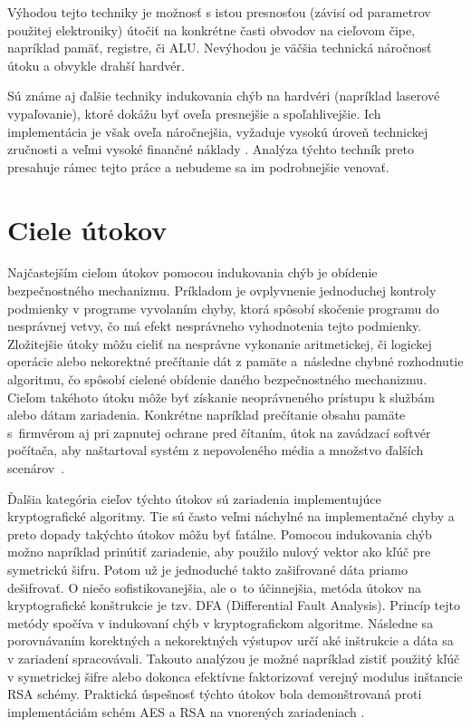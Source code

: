 Výhodou tejto techniky je možnosť s istou presnosťou (závisí od parametrov použitej elektroniky) útočiť na konkrétne časti obvodov na cieľovom čipe, napríklad pamäť, registre, či ALU. Nevýhodou je väčšia technická náročnosť útoku a obvykle drahší hardvér.

Sú známe aj ďalšie techniky indukovania chýb na hardvéri (napríklad laserové vypaľovanie), ktoré dokážu byť oveľa presnejšie a spoľahlivejšie. Ich implementácia je však oveľa náročnejšia, vyžaduje vysokú úroveň technickej zručnosti a veľmi vysoké finančné náklady \cite{laserFI}. Analýza týchto techník preto presahuje rámec tejto práce a nebudeme sa im podrobnejšie venovať.

\section{Ciele útokov} \label{kap1:sek:cieleUtokov}
Najčastejším cieľom útokov pomocou indukovania chýb je obídenie bezpečnostného mechanizmu. Príkladom je ovplyvnenie jednoduchej kontroly podmienky v programe vyvolaním chyby, ktorá spôsobí skočenie programu do nesprávnej vetvy, čo má efekt nesprávneho vyhodnotenia tejto podmienky. Zložitejšie útoky môžu cieliť na nesprávne vykonanie aritmetickej, či logickej operácie alebo nekorektné prečítanie dát z pamäte a~následne chybné rozhodnutie algoritmu, čo spôsobí cielené obídenie daného bezpečnostného mechanizmu. Cieľom takéhoto útoku môže byť získanie neoprávneného prístupu k službám alebo dátam zariadenia. Konkrétne napríklad prečítanie obsahu pamäte s~firmvérom aj pri zapnutej ochrane pred čítaním, útok na zavádzací softvér počítača, aby naštartoval systém z nepovoleného média a množstvo ďalších scenárov~\cite{AntiFI, bootloader}.

Ďalšia kategória cieľov týchto útokov sú zariadenia implementujúce kryptografické algoritmy. Tie sú často veľmi náchylné na implementačné chyby a preto dopady takýchto útokov môžu byť fatálne. Pomocou indukovania chýb možno napríklad prinútiť zariadenie, aby použilo nulový vektor ako kľúč pre symetrickú šifru. Potom už je jednoduché takto zašifrované dáta priamo dešifrovať. O niečo sofistikovanejšia, ale o~to účinnejšia, metóda útokov na kryptografické konštrukcie je tzv. DFA (Differential Fault Analysis). Princíp tejto metódy spočíva v indukovaní chýb v kryptografickom algoritme. Následne sa porovnávaním korektných a nekorektných výstupov určí aké inštrukcie a dáta sa v zariadení spracovávali. Takouto analýzou je možné napríklad zistiť použitý kľúč v symetrickej šifre alebo dokonca efektívne faktorizovať verejný modulus inštancie RSA schémy. Praktická úspešnosť týchto útokov bola demonštrovaná proti implementáciám schém AES a RSA na vnorených zariadeniach \cite{crypto}.

